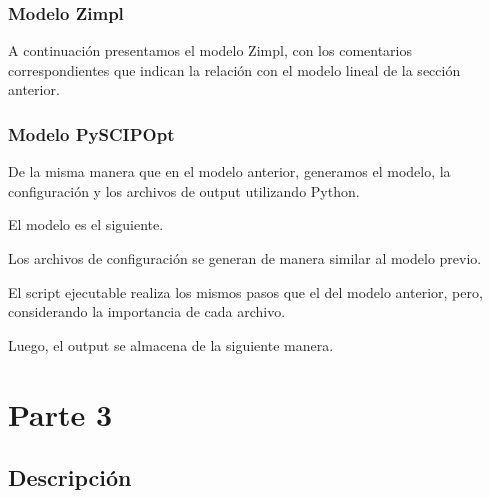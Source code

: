 \documentclass[11pt, a4paper, pdftex]{article}
\begin{document}
\newpage
\subsubsection{Modelo Zimpl}

A continuación presentamos el modelo Zimpl, con los comentarios correspondientes que indican la relación con el modelo lineal de la sección anterior.



\newpage
\subsubsection{Modelo PySCIPOpt}

De la misma manera que en el modelo anterior, generamos el modelo, la configuración y los 
archivos de output utilizando Python.

El modelo es el siguiente.



\newpage
Los archivos de configuración se generan de manera similar al modelo previo.




\newpage

El script ejecutable realiza los mismos pasos que el del modelo anterior, pero, considerando 
la importancia de cada archivo.



\newpage

Luego, el output se almacena de la siguiente manera.



\newpage
\section{Parte 3}

\subsection{Descripción}
\end{document}
